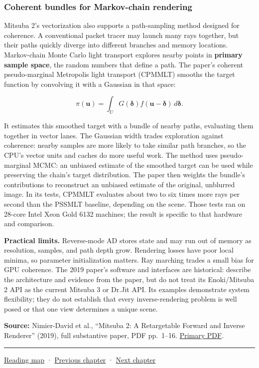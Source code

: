 \subsubsection{Coherent bundles for Markov-chain rendering}\label{03-visual-computing-i-ch011-coherent-bundles-for-markov-chain-rendering}

Mitsuba 2's vectorization also supports a path-sampling method designed for coherence. A conventional packet tracer may launch many rays together, but their paths quickly diverge into different branches and memory locations. Markov-chain Monte Carlo light transport explores nearby points in \textbf{primary sample space}, the random numbers that define a path. The paper's coherent pseudo-marginal Metropolis light transport (CPMMLT) smooths the target function by convolving it with a Gaussian in that space:

\[\pi(\mathbf{u})=\int_U G(\boldsymbol\delta)f(\mathbf{u}-\boldsymbol\delta)\,d\boldsymbol\delta.\]

It estimates this smoothed target with a bundle of nearby paths, evaluating them together in vector lanes. The Gaussian width trades exploration against coherence: nearby samples are more likely to take similar path branches, so the CPU's vector units and caches do more useful work. The method uses pseudo-marginal MCMC: an unbiased estimate of the smoothed target can be used while preserving the chain's target distribution. The paper then weights the bundle's contributions to reconstruct an unbiased estimate of the original, unblurred image. In its tests, CPMMLT evaluates about two to six times more rays per second than the PSSMLT baseline, depending on the scene. Those tests ran on 28-core Intel Xeon Gold 6132 machines; the result is specific to that hardware and comparison.

\textbf{Practical limits.} Reverse-mode AD stores state and may run out of memory as resolution, samples, and path depth grow. Rendering losses have poor local minima, so parameter initialization matters. Ray marching trades a small bias for GPU coherence. The 2019 paper's software and interfaces are historical: describe the architecture and evidence from the paper, but do not treat its Enoki/Mitsuba 2 API as the current Mitsuba 3 or Dr.Jit API. Its examples demonstrate system flexibility; they do not establish that every inverse-rendering problem is well posed or that one view determines a unique scene.

\textbf{Source:} Nimier-David et al., ``Mitsuba 2: A Retargetable Forward and Inverse Renderer'' (2019), full substantive paper, PDF pp.~1--16. \href{https://rgl.s3.eu-central-1.amazonaws.com/media/papers/NimierDavidVicini2019Mitsuba2_7.pdf}{Primary PDF}.

\begin{center}\rule{0.5\linewidth}{0.5pt}\end{center}

\hyperref[volume-reading-map]{Reading map} · \hyperref[03-visual-computing-i-ch010-a-production-path-tracer-media-randomness-and-validation]{Previous chapter} · \hyperref[03-visual-computing-i-ch012-probability-statistics-and-uncertainty]{Next chapter}
